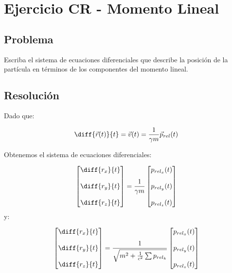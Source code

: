 \section{Ejercicio CR - Momento Lineal}

\subsection{Problema}
Escriba el sistema de ecuaciones diferenciales que describe la posición de la partícula en términos de los componentes del momento lineal.

\subsection{Resolución}

Dado que:

$$
\diff{\vec{r}(t)}{t} = \vec{v}(t) = \frac{1}{\gamma m} \vec{p}_{rel}(t)
$$

Obtenemos el sistema de ecuaciones diferenciales:

\begin{equation*} 
	\begin{bmatrix} 
		\diff{r_x}{t} \\ \\
		\diff{r_y}{t} \\ \\ 
		\diff{r_z}{t} 
	\end{bmatrix} = 
\frac{1}{\gamma m}
\begin{bmatrix}
	p_{rel_x}(t) \\ \\ p_{rel_y}(t) \\ \\ p_{rel_z}(t)
\end{bmatrix}
\end{equation*} 
y: 

\begin{equation*} 
	\begin{bmatrix} 
		\diff{r_x}{t} \\ \\
		\diff{r_y}{t} \\ \\ 
		\diff{r_z}{t} 
	\end{bmatrix} = 
	\frac{1}{\sqrt{ 
			m^2 + \frac{1}{c^2} \sum p_{rel_k}	
	}}
	\begin{bmatrix}
		p_{rel_x}(t) \\ \\ p_{rel_y}(t) \\ \\ p_{rel_z}(t)
	\end{bmatrix}
\end{equation*} 
